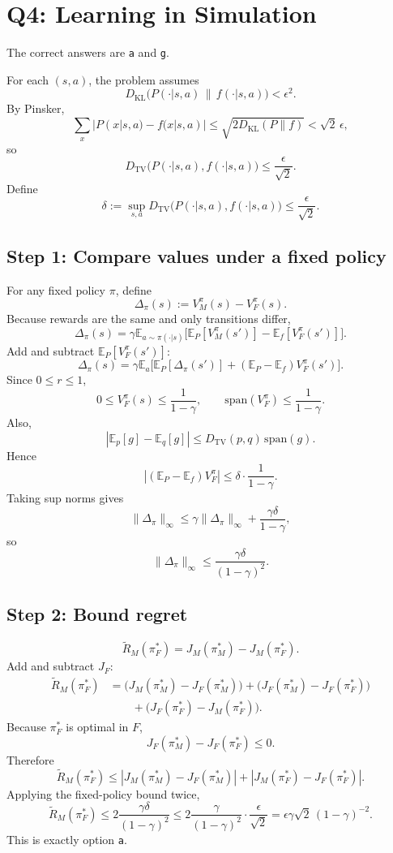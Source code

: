 \documentclass[11pt]{article}
\newcommand{\E}{\mathbb{E}}
\newcommand{\KL}{D_{\mathrm{KL}}}
\newcommand{\TV}{D_{\mathrm{TV}}}
\newcommand{\1}{\mathbf{1}}
\newcommand{\eps}{\epsilon}
\begin{document}
\section{Q4: Learning in Simulation}
The correct answers are \texttt{a} and \texttt{g}.

For each $(s,a)$, the problem assumes
\[
\KL\big(P(\cdot|s,a)\,\|\,f(\cdot|s,a)\big)<\eps^2.
\]
By Pinsker,
\[
\sum_x |P(x|s,a)-f(x|s,a)|
\le \sqrt{2\KL(P\|f)}
< \sqrt{2}\,\eps,
\]
so
\[
\TV\big(P(\cdot|s,a),f(\cdot|s,a)\big)
\le \frac{\eps}{\sqrt{2}}.
\]
Define
\[
\delta := \sup_{s,a}\TV\big(P(\cdot|s,a),f(\cdot|s,a)\big)\le \frac{\eps}{\sqrt{2}}.
\]

\subsection*{Step 1: Compare values under a fixed policy}
For any fixed policy $\pi$, define
\[
\Delta_\pi(s):=V_M^\pi(s)-V_F^\pi(s).
\]
Because rewards are the same and only transitions differ,
\[
\Delta_\pi(s)
=
\gamma \E_{a\sim \pi(\cdot|s)}
\Big[
\E_P[V_M^\pi(s')] - \E_f[V_F^\pi(s')]
\Big].
\]
Add and subtract $\E_P[V_F^\pi(s')]$:
\[
\Delta_\pi(s)
=
\gamma \E_a
\Big[
\E_P[\Delta_\pi(s')]
+ (\E_P-\E_f)V_F^\pi(s')
\Big].
\]
Since $0\le r\le 1$,
\[
0\le V_F^\pi(s)\le \frac{1}{1-\gamma},
\qquad
\mathrm{span}(V_F^\pi)\le \frac{1}{1-\gamma}.
\]
Also,
\[
\left|\E_p[g]-\E_q[g]\right|
\le \TV(p,q)\,\mathrm{span}(g).
\]
Hence
\[
\left|(\E_P-\E_f)V_F^\pi\right|
\le \delta\cdot \frac{1}{1-\gamma}.
\]
Taking sup norms gives
\[
\|\Delta_\pi\|_\infty
\le
\gamma \|\Delta_\pi\|_\infty
+ \frac{\gamma\delta}{1-\gamma},
\]
so
\[
\|\Delta_\pi\|_\infty
\le
\frac{\gamma\delta}{(1-\gamma)^2}.
\]

\subsection*{Step 2: Bound regret}
\[
\widetilde R_M(\pi_F^*)
=
J_M(\pi_M^*)-J_M(\pi_F^*).
\]
Add and subtract $J_F$:
\[
\begin{aligned}
\widetilde R_M(\pi_F^*)
&=
\big(J_M(\pi_M^*)-J_F(\pi_M^*)\big)
+\big(J_F(\pi_M^*)-J_F(\pi_F^*)\big) \\
&\qquad
+\big(J_F(\pi_F^*)-J_M(\pi_F^*)\big).
\end{aligned}
\]
Because $\pi_F^*$ is optimal in $F$,
\[
J_F(\pi_M^*)-J_F(\pi_F^*)\le 0.
\]
Therefore
\[
\widetilde R_M(\pi_F^*)
\le
|J_M(\pi_M^*)-J_F(\pi_M^*)|
+|J_M(\pi_F^*)-J_F(\pi_F^*)|.
\]
Applying the fixed-policy bound twice,
\[
\widetilde R_M(\pi_F^*)
\le
2\frac{\gamma\delta}{(1-\gamma)^2}
\le
2\frac{\gamma}{(1-\gamma)^2}\cdot \frac{\eps}{\sqrt{2}}
=
\eps\gamma\sqrt{2}\,(1-\gamma)^{-2}.
\]
This is exactly option \texttt{a}.
\end{document}
